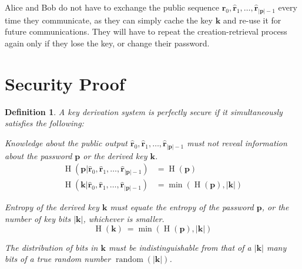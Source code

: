 \documentclass[twocolumn,hidelinks]{article}
\DeclareMathOperator{\random}{random}
\DeclareMathOperator{\entropy}{H}
\newtheorem{definition}{Definition}[section]
\begin{document}
Alice and Bob do not have to exchange the public sequence $\mathbf{\hat
r}_0, \mathbf{\hat r}_1, \ldots, \mathbf{\hat r}_{|\mathbf{p}|-1}$ every
time they communicate, as they can simply cache the key $\mathbf{k}$ and
re-use it for future communications. They will have to repeat the
creation-retrieval process again only if they lose the key, or change their
password.

\section{Security Proof}
\begin{definition}
    A key derivation system is \emph{perfectly secure} if it simultaneously
    satisfies the following:
    \begin{description}[itemsep=0em]
        \item[Safe public output:]  Knowledge about the public output
            $\mathbf{\hat r}_0, \mathbf{\hat r}_1, \ldots, \mathbf{\hat
            r}_{|\mathbf{p}|-1}$ must not reveal information about
            the password $\mathbf{p}$ or the derived key $\mathbf{k}$.
            \begin{align*}
                \entropy(\mathbf{p} | \mathbf{\hat r}_0, \mathbf{\hat r}_1,
                \ldots, \mathbf{\hat r}_{|\mathbf{p}|-1}) &=
                \entropy(\mathbf{p}) \\
                \entropy(\mathbf{k} | \mathbf{\hat r}_0, \mathbf{\hat r}_1,
                \ldots, \mathbf{\hat r}_{|\mathbf{p}|-1}) &=
                \min(\entropy(\mathbf{p}), |\mathbf{k}|)
            \end{align*}
        \item[Maximum key entropy:]  Entropy of the derived key
            $\mathbf{k}$ must equate the entropy of the password
            $\mathbf{p}$, or the number of key bits $|\mathbf{k}|$,
            whichever is smaller.
            \[
                \entropy(\mathbf{k}) \
                    = \min(\entropy(\mathbf{p}), |\mathbf{k}|)
            \]
        \item[Random-looking key:]  The distribution of bits in
            $\mathbf{k}$ must be indistinguishable from that of a
            $|\mathbf{k}|$ many bits of a true random number
            $\random(|\mathbf{k}|)$.
    \end{description}
\end{definition}
\end{document}
